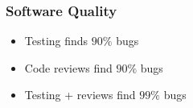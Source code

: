 \begin{frame}[fragile] \frametitle{Software Quality}
\begin{itemize}
  \item Testing finds $90\%$ bugs
  \item Code reviews find $90\%$ bugs
  \item Testing + reviews find $99\%$ bugs
\end{itemize}
\end{frame}
